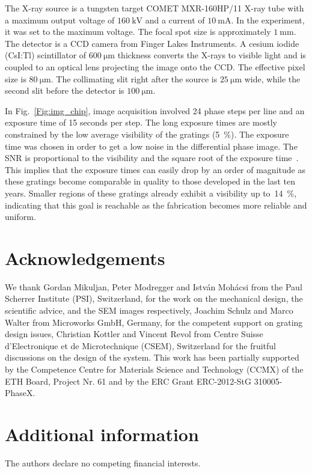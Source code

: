 \documentclass[english]{nature}
\begin{document}
The X-ray source is a tungsten target COMET MXR-160HP/11 X-ray tube with a maximum output
voltage of $\SI{160}{\kilo\volt}$ and a current of $\SI{10}{\milli\ampere}$. In the experiment, it was set to the
maximum voltage. The focal spot size is approximately
$\SI{1}{\milli\metre}$. The detector is a CCD camera from Finger Lakes
Instruments. A cesium iodide (CsI:Tl) scintillator of $\SI{600}{\micro
\metre}$ thickness converts the X-rays to visible light and is coupled to
an optical lens projecting the image onto the CCD\@. The effective pixel size
is $\SI{80}{\micro\metre}$. The collimating slit right after the source is 
$\SI{25}{\micro\metre}$ wide, while the second slit before the detector is
$\SI{100}{\micro\metre}$.

In Fig.~\ref{Fig:img_chip}, image acquisition involved 24 phase steps per
line and an exposure time of 15 seconds per step. The long
exposure times are mostly constrained by the low average visibility of the
gratings (\SI{5}{\percent}). The exposure time was chosen in order to
get a low noise in the differential phase image. The \ac{SNR} is
proportional to the visibility and the square root of the exposure
time~\cite{Raupach2011}.
This implies that the exposure times can easily drop by an order of
magnitude as these gratings become comparable in quality to those developed
in the last ten years. 
Smaller regions of these gratings already exhibit a visibility up
to~\SI{14}{\percent}, indicating that this goal is reachable as the
fabrication becomes more reliable and uniform.

\section*{Acknowledgements}
We thank Gordan Mikuljan, Peter Modregger and István Mohácsi from the Paul
Scherrer Institute (PSI), Switzerland, for the
work on the mechanical design, the scientific advice, and the \ac{SEM} images
respectively, Joachim Schulz and Marco Walter from
Microworks GmbH, Germany, for the competent support on grating design
issues, Christian Kottler and Vincent Revol from Centre Suisse
d'Electronique et de Microtechnique (CSEM), Switzerland for the fruitful
discussions on the design of the system. This work has been partially
supported by the Competence Centre for Materials Science and Technology
(CCMX) of the ETH Board, Project Nr. 61 and by the ERC Grant ERC-2012-StG 310005-PhaseX.

\section*{Additional information}
The authors declare no competing financial interests.
\end{document}
